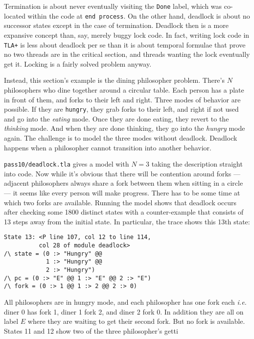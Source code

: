 \documentclass[twocolumn]{article}
\begin{document}
\noindent Termination is about never eventually visiting the \texttt{Done} label, which was co-located within the code at \texttt{end process}. On the other hand, deadlock is about no successor states except in the case of termination. Deadlock then is a more expansive concept than, say, merely buggy lock code. In fact, writing lock code in \texttt{TLA+} is less about deadlock per se than it is about temporal formulae that prove no two threads are in the critical section, and threads wanting the lock eventually get it. Locking is a fairly solved problem anyway. 

Instead, this section's example is the dining philosopher problem. There's $N$ philosophers who dine together around a circular table. Each person has a plate in front of them, and forks to their left and right. Three modes of behavior are possible. If they are \texttt{hungry}, they grab forks to their left, and right if not used and go into the \emph{eating} mode. Once they are done eating, they revert to the \emph{thinking} mode. And when they are done thinking, they go into the \emph{hungry} mode again. The challenge is to model the three modes without deadlock. Deadlock happens when a philosopher cannot transition into another behavior. 

\texttt{pass10/deadlock.tla} gives a model with $N=3$ taking the description straight into code. Now while it's obvious that there will be contention around forks --- adjacent philosophers always share a fork between them when sitting in a circle --- it seems like every person will make progress. There has to be some time at which two forks are available. Running the model shows that deadlock occurs after checking some 1800 distinct states with a counter-example that consists of 13 steps away from the initial state. In particular, the trace shows this 13th state:

\begin{verbatim}
State 13: <P line 107, col 12 to line 114,
          col 28 of module deadlock>
/\ state = (0 :> "Hungry" @@ 
            1 :> "Hungry" @@ 
            2 :> "Hungry")
/\ pc = (0 :> "E" @@ 1 :> "E" @@ 2 :> "E")
/\ fork = (0 :> 1 @@ 1 :> 2 @@ 2 :> 0)
\end{verbatim}

All philosophers are in hungry mode, and each philosopher has one fork each \emph{i.e.} diner 0 has fork 1, diner 1 fork 2, and diner 2 fork 0. In addition they are all on label $E$ where they are waiting to get their second fork. But no fork is available. States 11 and 12 show two of the three philosopher's getti
\end{document}
